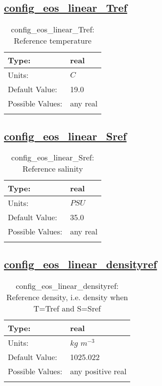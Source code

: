 \subsection[config\_eos\_linear\_Tref]{\hyperref[sec:nm_tab_eos_linear]{config\_eos\_linear\_Tref}}
\label{subsec:nm_sec_config_eos_linear_Tref}
\begin{center}
\begin{longtable}{| p{2.0in} | p{4.0in} |}
    \hline
    Type: & real \\
    \hline
    Units: & $C$ \\
    \hline
    Default Value: & 19.0 \\
    \hline
    Possible Values: & any real \\
    \hline
    \caption{config\_eos\_linear\_Tref: Reference temperature}
\end{longtable}
\end{center}
\subsection[config\_eos\_linear\_Sref]{\hyperref[sec:nm_tab_eos_linear]{config\_eos\_linear\_Sref}}
\label{subsec:nm_sec_config_eos_linear_Sref}
\begin{center}
\begin{longtable}{| p{2.0in} | p{4.0in} |}
    \hline
    Type: & real \\
    \hline
    Units: & $PSU$ \\
    \hline
    Default Value: & 35.0 \\
    \hline
    Possible Values: & any real \\
    \hline
    \caption{config\_eos\_linear\_Sref: Reference salinity}
\end{longtable}
\end{center}
\subsection[config\_eos\_linear\_densityref]{\hyperref[sec:nm_tab_eos_linear]{config\_eos\_linear\_densityref}}
\label{subsec:nm_sec_config_eos_linear_densityref}
\begin{center}
\begin{longtable}{| p{2.0in} | p{4.0in} |}
    \hline
    Type: & real \\
    \hline
    Units: & $kg$ $m^{-3}$ \\
    \hline
    Default Value: & 1025.022 \\
    \hline
    Possible Values: & any positive real \\
    \hline
    \caption{config\_eos\_linear\_densityref: Reference density, i.e. density when T=Tref and S=Sref}
\end{longtable}
\end{center}
